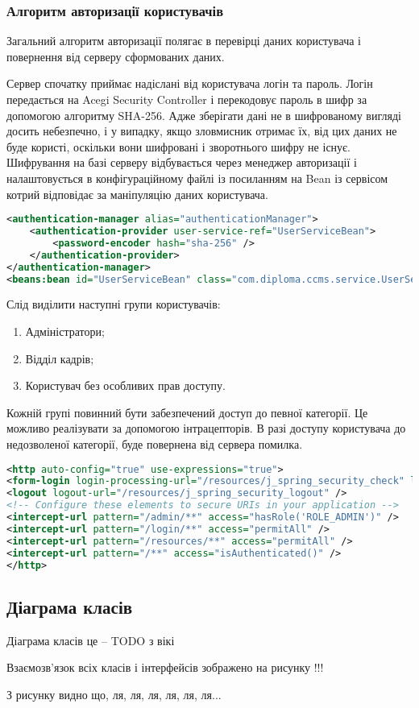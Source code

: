 \subsubsection{Алгоритм авторизації користувачів}
Загальний алгоритм авторизації полягає в перевірці даних користувача і повернення від серверу сформованих даних.
\par Сервер спочатку приймає надіслані від користувача логін та пароль. Логін передається на Acegi Security Controller і перекодовує пароль в шифр за допомогою алгоритму SHA-256. Адже зберігати дані не в шифрованому вигляді досить небезпечно, і у випадку, якщо зловмисник отримає їх, від цих даних не буде користі, оскільки вони шифровані і зворотнього шифру не існує. Шифрування на базі серверу відбувається через менеджер авторизації і налаштовується в конфігураційному файлі із посиланням на Bean із сервісом котрий відповідає за маніпуляцію даних користувача.

\begin{lstlisting}[language=Xml]
<authentication-manager alias="authenticationManager">
	<authentication-provider user-service-ref="UserServiceBean">
		<password-encoder hash="sha-256" />
	</authentication-provider>
</authentication-manager>
<beans:bean id="UserServiceBean" class="com.diploma.ccms.service.UserService" />
\end{lstlisting}

Слід виділити наступні групи користувачів:
\begin{enumerate}
	\item Адміністратори;
	\item Відділ кадрів;
	\item Користувач без особливих прав доступу.
\end{enumerate}

\par Кожній групі повинний бути забезпечений доступ до певної категорії. Це можливо реалізувати за допомогою інтрацепторів. В разі доступу користувача до недозволеної категорії, буде повернена від сервера помилка.

\begin{lstlisting}[language=Xml]
<http auto-config="true" use-expressions="true">
<form-login login-processing-url="/resources/j_spring_security_check" login-page="/login" authentication-failure-url="/login?login_error=t" />
<logout logout-url="/resources/j_spring_security_logout" />
<!-- Configure these elements to secure URIs in your application -->
<intercept-url pattern="/admin/**" access="hasRole('ROLE_ADMIN')" />
<intercept-url pattern="/login/**" access="permitAll" />
<intercept-url pattern="/resources/**" access="permitAll" />
<intercept-url pattern="/**" access="isAuthenticated()" />
</http>
\end{lstlisting}


\subsection{Діаграма класів}
\par Діаграма класів це -- TODO з вікі
\par Взаємозв'язок всіх класів і інтерфейсів зображено на рисунку  !!!
\par З рисунку  видно що, ля, ля, ля, ля, ля, ля...




